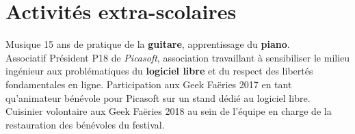 \documentclass[a4paper]{twentysecondcv} %
\begin{document}
\section{Activités extra-scolaires}
\begin{twenty}
	\twentyitem
    	{}
		{}
        {Musique}
        {}
        {}
        {15 ans de pratique de la \textbf{guitare}, apprentissage du \textbf{piano}.}
    \\
    \twentyitem
    	{}
		{}
        {Associatif}
        {}
        {}
        {Président P18 de \textit{Picasoft}, association travaillant à sensibiliser le milieu ingénieur aux problématiques du \textbf{logiciel libre} et du respect des libertés fondamentales en ligne. Participation aux Geek Faëries 2017 en tant qu'animateur bénévole pour Picasoft sur un stand dédié au logiciel libre.\\Cuisinier volontaire aux Geek Faëries 2018 au sein de l'équipe en charge de la restauration des bénévoles du festival.}
\end{twenty}
\end{document}
